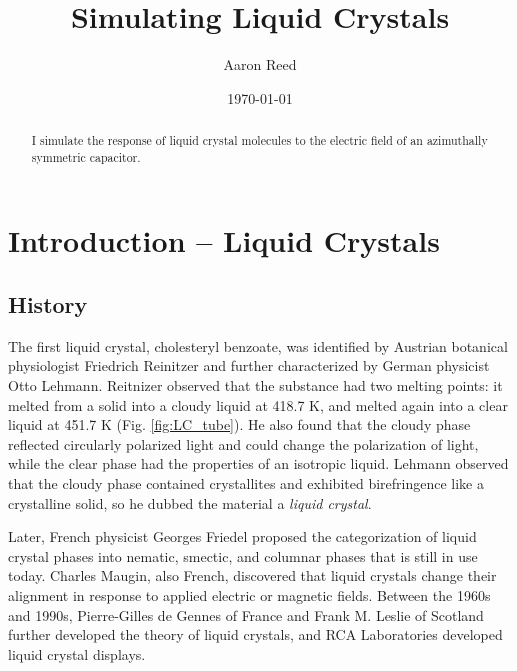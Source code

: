 \documentclass[twocolumn,aps,prl]{revtex4-1} %
\begin{document}
\raggedbottom

\title{Simulating Liquid Crystals}

\author{Aaron Reed}
\date{\today}

\begin{abstract}
I simulate the response of liquid crystal molecules to the electric field of an azimuthally symmetric capacitor.
\end{abstract}

\maketitle

\section{Introduction -- Liquid Crystals}

\subsection{History}
The first liquid crystal, cholesteryl benzoate, was identified by Austrian botanical physiologist Friedrich Reinitzer and further characterized by German physicist Otto Lehmann. \cite{dunmur_soap_2011} Reitnizer observed that the substance had two melting points: it melted from a solid into a cloudy liquid at 418.7 K, and melted again into a clear liquid at 451.7 K (Fig. \ref{fig:LC_tube}).  He also found that the cloudy phase reflected circularly polarized light and could change the polarization of light, while the clear phase had the properties of an isotropic liquid.  Lehmann observed that the cloudy phase contained crystallites and exhibited birefringence like a crystalline solid, so he dubbed the material a \textit{liquid crystal}.

Later, French physicist Georges Friedel proposed the categorization of liquid crystal phases into nematic, smectic, and columnar phases that is still in use today.  Charles Maugin, also French, discovered that liquid crystals change their alignment in response to applied electric or magnetic fields.  Between the 1960s and 1990s, Pierre-Gilles de Gennes of France and Frank M. Leslie of Scotland further developed the theory of liquid crystals, and RCA Laboratories developed liquid crystal displays.
\end{document}

